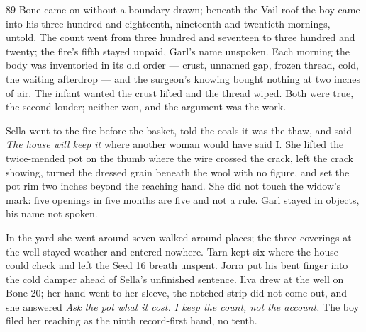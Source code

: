 
\scenebreak


\scenebreak


\scenebreak

\CRtailpiece
\begin{CRchronicle}{89}
Bone came on without a boundary drawn; beneath the Vail roof the boy came into his three hundred and eighteenth, nineteenth and twentieth mornings, untold. The count went from three hundred and seventeen to three hundred and twenty; the fire’s fifth stayed unpaid, Garl’s name unspoken. Each morning the body was inventoried in its old order --- crust, unnamed gap, frozen thread, cold, the waiting afterdrop --- and the surgeon’s knowing bought nothing at two inches of air. The infant wanted the crust lifted and the thread wiped. Both were true, the second louder; neither won, and the argument was the work.

Sella went to the fire before the basket, told the coals it was the thaw, and said \emph{The house will keep it} where another woman would have said I. She lifted the twice-mended pot on the thumb where the wire crossed the crack, left the crack showing, turned the dressed grain beneath the wool with no figure, and set the pot rim two inches beyond the reaching hand. She did not touch the widow’s mark: five openings in five months are five and not a rule. Garl stayed in objects, his name not spoken.

In the yard she went around seven walked-around places; the three coverings at the well stayed weather and entered nowhere. Tarn kept six where the house could check and left the Seed 16 breath unspent. Jorra put his bent finger into the cold damper ahead of Sella’s unfinished sentence. Ilva drew at the well on Bone 20; her hand went to her sleeve, the notched strip did not come out, and she answered \emph{Ask the pot what it cost. I keep the count, not the account.} The boy filed her reaching as the ninth record-first hand, no tenth.


\end{CRchronicle}
